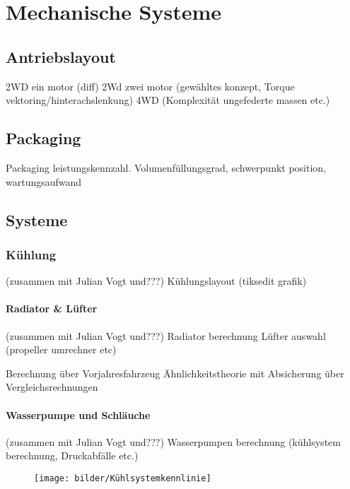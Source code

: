 
\chapter{Mechanische Systeme}

\section{Antriebslayout}
2WD ein motor (diff)
2Wd zwei motor (gewähltes konzept, Torque vektoring/hinterachslenkung)
4WD (Komplexität ungefederte massen etc.)

\section{Packaging}
Packaging leistungskennzahl. Volumenfüllungsgrad, schwerpunkt position, wartungsaufwand

\section{Systeme}

\subsection{Kühlung} (zusammen mit Julian Vogt und???)
Kühlungslayout (tiksedit grafik)


\subsubsection{Radiator \& Lüfter} (zusammen mit Julian Vogt und???)
Radiator berechnung
Lüfter auswahl (propeller umrechner etc)

Berechnung über Vorjahresfahrzeug Ähnlichkeitstheorie mit Absicherung über Vergleichsrechnungen



\subsubsection{Wasserpumpe und Schläuche} (zusammen mit Julian Vogt und???)
Wasserpumpen berechnung (kühlsystem berechnung, Druckabfälle etc.)



\begin{figure}
	\centering
	\texttt{[image: bilder/Kühlsystemkennlinie]}
	\caption{}
	\label{fig:kuhlsystemkennlinie}
\end{figure}


